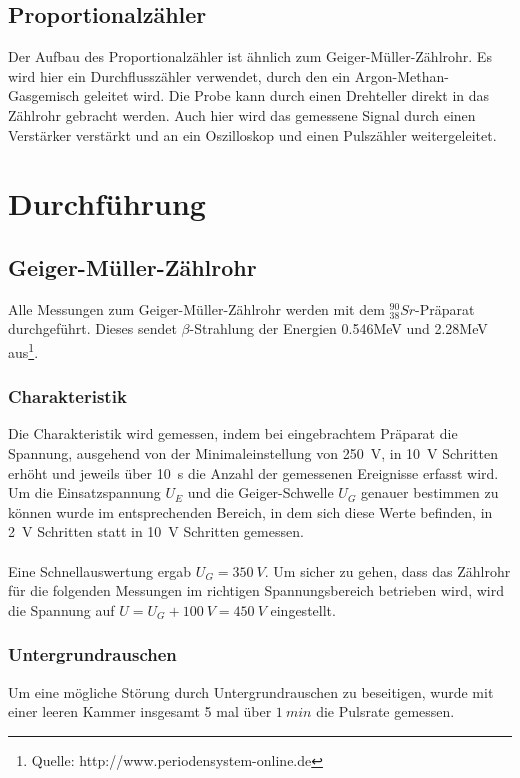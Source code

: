 \documentclass[12pt,a4paper]{article}
\begin{document}
\subsection{Proportionalzähler}
Der Aufbau des Proportionalzähler ist ähnlich zum Geiger-Müller-Zählrohr. Es wird hier ein Durchflusszähler verwendet, durch den ein Argon-Methan-Gasgemisch geleitet wird. Die Probe kann durch einen Drehteller direkt in das Zählrohr gebracht werden. Auch hier wird das gemessene Signal durch einen Verstärker verstärkt und an ein Oszilloskop und einen Pulszähler weitergeleitet.
\section{Durchführung}
\subsection{Geiger-Müller-Zählrohr}
Alle Messungen zum Geiger-Müller-Zählrohr werden mit dem $_{38}^{90}Sr$-Präparat durchgeführt. Dieses sendet $\beta$-Strahlung der Energien 0.546MeV und 2.28MeV aus\footnote{Quelle: http://www.periodensystem-online.de}.
\subsubsection{Charakteristik}
Die Charakteristik wird gemessen, indem bei eingebrachtem Präparat die Spannung, ausgehend von der Minimaleinstellung von \SI{250}{V}, in \SI{10}{V} Schritten erhöht und jeweils über \SI{10}{s} die Anzahl der gemessenen Ereignisse erfasst wird.\\
Um die Einsatzspannung $U_E$ und die Geiger-Schwelle $U_G$ genauer bestimmen zu können wurde im entsprechenden Bereich, in dem sich diese Werte befinden, in \SI{2}{V} Schritten statt in \SI{10}{V} Schritten gemessen.\\
\\Eine Schnellauswertung ergab $U_G = \SI{350}{V}$. Um sicher zu gehen, dass das Zählrohr für die folgenden Messungen im richtigen Spannungsbereich betrieben wird, wird die Spannung auf $U = U_G + \SI{100}{V} = \SI{450}{V}$ eingestellt.

\subsubsection{Untergrundrauschen}
Um eine mögliche Störung durch Untergrundrauschen zu beseitigen, wurde mit einer leeren Kammer insgesamt 5 mal über $\SI{1}{min}$ die Pulsrate gemessen.
\end{document}
